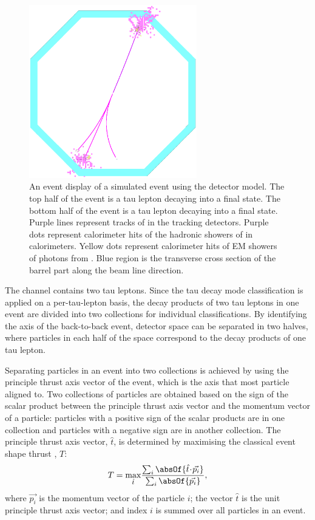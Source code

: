 \begin{figure}[tbph]
\centering
\includegraphics[width=0.65\textwidth]{tau/tau_evt_dsp2}
\caption{ An event display of a simulated \eeToTauTau event using the \ILD detector model. The top half of the event is a tau lepton decaying into a \decayRhoFinalState final state. The bottom half of the event is a tau lepton decaying into a \decayThreePionPhoton final state. Purple lines represent tracks of \Ppipm in the tracking detectors. Purple dots represent  calorimeter hits of the hadronic showers of \Ppipm in calorimeters. Yellow dots represent calorimeter hits of EM showers of photons  from \HepProcess{\Ppizero \to \Pphoton \Pphoton}. Blue region is the transverse cross section of the \ECAL barrel part along the beam line direction.}
\label{fig:tauEvtDsp}
\end{figure}


The \eeToTauTau channel contains two tau leptons. Since the tau decay mode classification is applied on a per-tau-lepton basis, the decay products of two tau leptons in one event are divided into two collections for individual classifications. By identifying the axis of the back-to-back \eeToTauTau event, detector space can be separated in two halves, where particles in each half of the space correspond to the decay products of one tau lepton.

Separating particles in an event into two collections is achieved by using the principle thrust axis vector of the event, which is the axis that most particle aligned to. Two collections of particles are obtained based on the sign of the scalar product between the principle thrust axis vector  and the momentum vector of a particle: particles with a positive sign of the scalar products are in one collection and particles with a negative sign are in another collection. The principle thrust axis vector, $\hat{t}$, is determined by maximising the classical event shape thrust \cite{PhysRevLett.39.1587}, $T$:
\begin{equation}
T = \max_{\hat{t}}\!\frac{\sum_{i}\absOf{\hat{t}\!\cdot\!\vec{p_{i}}}}{\sum_{i}\absOf{\vec{p_{i}}}},
\end{equation}
where $\vec{p_{i}}$ is the momentum vector of the particle $i$;  the vector $\hat{t}$ is the unit principle thrust axis vector; and index $i$ is summed over all particles in an event.


